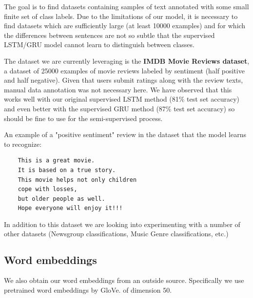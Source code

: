 \documentclass[11pt,letterpaper]{article}
\begin{document}
The goal is to find datasets containing samples of text annotated with some small finite set of class labels. Due to the limitations of our model, it is necessary to find datasets which are sufficiently large (at least 10000 examples) and for which the differences between sentences are not so subtle that the supervised LSTM/GRU model cannot learn to distinguish between classes. 

The dataset we are currently leveraging is the \textbf{IMDB Movie Reviews dataset}, a dataset of 25000 examples of movie reviews labeled by sentiment (half positive and half negative). Given that users submit ratings along with the review texts, manual data annotation was not necessary here. We have observed that this works well with our original supervised LSTM method (81\% test set accuracy) and even better with the supervised GRU method (87\% test set accuracy) so should be fine to use for the semi-supervised process.

An example of a "positive sentiment" review in the dataset that the model learns to recognize: \begin{verbatim}
	This is a great movie. 
	It is based on a true story. 
	This movie helps not only children 
	cope with losses, 
	but older people as well. 
	Hope everyone will enjoy it!!!
\end{verbatim}

In addition to this dataset we are looking into experimenting with a number of other datasets (Newsgroup classifications, Music Genre classifications, etc.)

\subsection{Word embeddings}

We also obtain our word embeddings from an outside source. Specifically we use pretrained word embeddings by GloVe. \cite{pennington2014glove}  of dimension 50.
\end{document}
